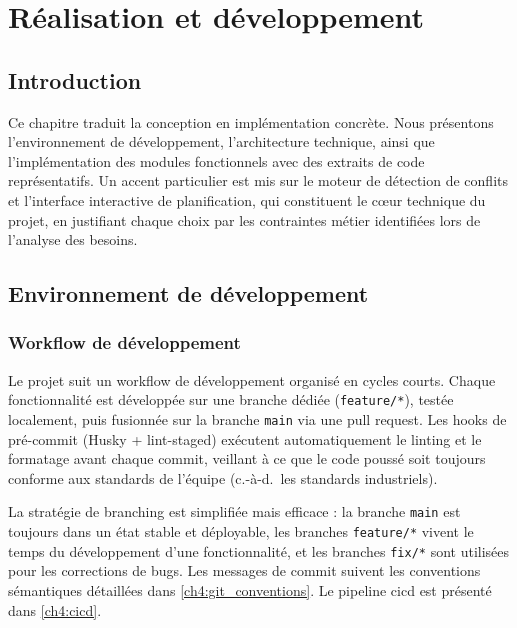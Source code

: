 \newpage
\section{Réalisation et développement}
\label{ch4}

\subsection{Introduction}
\label{ch4:intro}

Ce chapitre traduit la conception en implémentation concrète. Nous présentons l'environnement de développement, l'architecture technique, ainsi que l'implémentation des modules fonctionnels avec des extraits de code représentatifs. Un accent particulier est mis sur le moteur de détection de conflits et l'interface interactive de planification, qui constituent le cœur technique du projet, en justifiant chaque choix par les contraintes métier identifiées lors de l'analyse des besoins.

\subsection{Environnement de développement}
\label{ch4:environnement}

\subsubsection{Workflow de développement}
\label{ch4:workflow}

Le projet suit un workflow de développement organisé en cycles courts. Chaque fonctionnalité est développée sur une branche dédiée (\texttt{feature/*}), testée localement, puis fusionnée sur la branche \texttt{main} via une pull request. Les hooks de pré-commit (Husky + lint-staged) exécutent automatiquement le linting et le formatage avant chaque commit, veillant à ce que le code poussé soit toujours conforme aux standards de l'équipe (c.-à-d.\ les standards industriels).

La stratégie de branching est simplifiée mais efficace : la branche \texttt{main} est toujours dans un état stable et déployable, les branches \texttt{feature/*} vivent le temps du développement d'une fonctionnalité, et les branches \texttt{fix/*} sont utilisées pour les corrections de bugs. Les messages de commit suivent les conventions sémantiques détaillées dans \cref{ch4:git_conventions}. Le pipeline \acrshort{cicd} est présenté dans \cref{ch4:cicd}.

